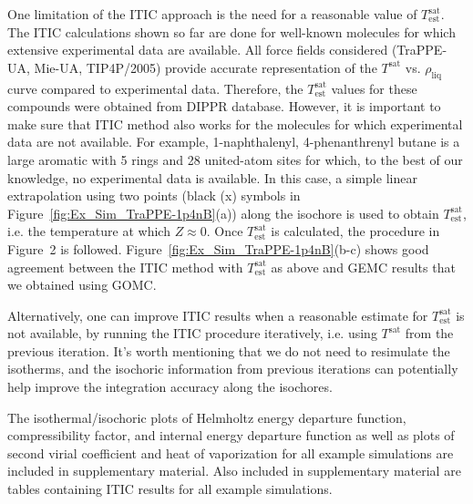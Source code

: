 \documentclass[5p,times]{elsarticle}
\begin{document}

One limitation of the ITIC approach is the need for a reasonable value of $T_\mathrm{est}^\mathrm{sat}$. The ITIC calculations shown so far are done for well-known molecules for which extensive experimental data are available. All force fields considered (TraPPE-UA, Mie-UA, TIP4P/2005) provide accurate representation of the $T^\mathrm{sat}$ vs. $\rho_\mathrm{liq}$ curve compared to experimental data. Therefore, the $T_\mathrm{est}^\mathrm{sat}$ values for these compounds were obtained from DIPPR database. However, it is important to make sure that ITIC method also works for the molecules for which experimental data are not available. For example, 1-naphthalenyl, 4-phenanthrenyl butane is a large aromatic with 5 rings and 28 united-atom sites for which, to the best of our knowledge, no experimental data is available. In this case, a simple linear extrapolation using two points (black (x) symbols in Figure~\ref{fig:Ex_Sim_TraPPE-1p4nB}(a)) along the isochore is used to obtain $T_\mathrm{est}^\mathrm{sat}$, i.e. the temperature at which $Z\approx0$. Once $T_\mathrm{est}^\mathrm{sat}$ is calculated, the procedure in Figure~2 is followed. Figure~\ref{fig:Ex_Sim_TraPPE-1p4nB}(b-c) shows good agreement between the ITIC method with $T_\mathrm{est}^\mathrm{sat}$ as above and GEMC results that we obtained using GOMC.

Alternatively, one can improve ITIC results when a reasonable estimate for $T_\mathrm{est}^\mathrm{sat}$ is not available, by running the ITIC procedure iteratively, i.e. using $T^\mathrm{sat}$ from the previous iteration. It's worth mentioning that we do not need to resimulate the isotherms, and the isochoric information from previous iterations can potentially help improve the integration accuracy along the isochores. 

The isothermal/isochoric plots of Helmholtz energy departure function, compressibility factor, and internal energy departure function as well as plots of second virial coefficient and heat of vaporization for all example simulations are included in supplementary material. Also included in supplementary material are tables containing ITIC results for all example simulations.
\end{document}
